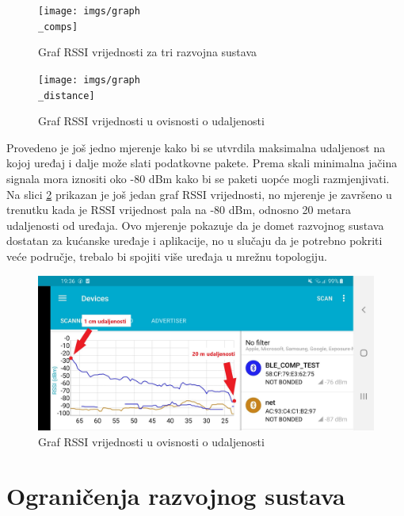 \begin{figure}[ht]
	\begin{minipage}[t]{0.4\textwidth}
		\texttt{[image: imgs/graph\\\_comps]}
		\caption{Graf RSSI vrijednosti za tri razvojna sustava}
		\label{fig:graph_comps}
	\end{minipage}
	\hspace*{\fill}
	\begin{minipage}[t]{0.4\textwidth}
		\texttt{[image: imgs/graph\\\_distance]}
		\caption{Graf RSSI vrijednosti u ovisnosti o udaljenosti}
		\label{fig:graph_distance}
	\end{minipage}
\end{figure}

Provedeno je još jedno mjerenje kako bi se utvrdila maksimalna udaljenost na kojoj uređaj i dalje može slati podatkovne pakete. Prema skali \cite{rssi} minimalna jačina signala mora iznositi oko -80 dBm kako bi se paketi uopće mogli razmjenjivati. Na slici \ref{fig:napolje} prikazan je još jedan graf RSSI vrijednosti, no mjerenje je završeno u trenutku kada je RSSI vrijednost pala na -80 dBm, odnosno 20 metara udaljenosti od uređaja. Ovo mjerenje pokazuje da je domet razvojnog sustava dostatan za kućanske uređaje i aplikacije, no u slučaju da je potrebno pokriti veće područje, trebalo bi spojiti više uređaja u mrežnu topologiju.

\begin{figure}[ht]
	\centering
	\includegraphics[scale=0.15]{imgs/napolje}
	\caption{Graf RSSI vrijednosti u ovisnosti o udaljenosti}
	\label{fig:napolje}
\end{figure}


\section{Ograničenja razvojnog sustava}

